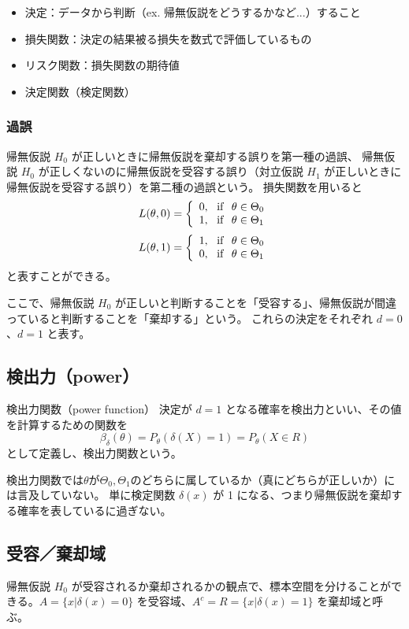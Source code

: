 \documentclass[10pt,a4paper]{ltjsarticle}
\begin{document}
\begin{itemize}
  \item 決定：データから判断（ex. 帰無仮説をどうするかなど...）すること
  \item 損失関数：決定の結果被る損失を数式で評価しているもの
  \item リスク関数：損失関数の期待値
  \item 決定関数（検定関数）
\end{itemize}


\subsubsection{過誤}

帰無仮説 $H_0$ が正しいときに帰無仮説を棄却する誤りを第一種の過誤、
帰無仮説 $H_0$ が正しくないのに帰無仮説を受容する誤り（対立仮説 $H_1$ が正しいときに帰無仮説を受容する誤り）を第二種の過誤という。
損失関数を用いると
\begin{equation}
  L(\theta, 0)
  = \left\{
    \begin{array}{ll}
    0,~~\rm{if~~\theta \in \Theta_0} \\
    1,~~\rm{if~~\theta \in \Theta_1} 
    \end{array}
  \right.
\end{equation}
\begin{equation}
  L(\theta, 1)
  = \left\{
    \begin{array}{ll}
    1,~~\rm{if~~\theta \in \Theta_0} \\
    0,~~\rm{if~~\theta \in \Theta_1} 
    \end{array}
  \right.
\end{equation}
と表すことができる。

ここで、帰無仮説 $H_0$ が正しいと判断することを「受容する」、帰無仮説が間違っていると判断することを「棄却する」という。
これらの決定をそれぞれ $d=0$、$d=1$ と表す。


\subsection{検出力（power）}

\begin{itembox}[l]{検出力関数（power function）}
  決定が $d=1$ となる確率を検出力といい、その値を計算するための関数を
\begin{equation}
  \beta_\delta(\theta) = P_\theta(\delta(X)=1) = P_\theta(X\in R)
\end{equation}
として定義し、検出力関数という。
\end{itembox}

検出力関数では$\theta$が$\Theta_0,\Theta_1$のどちらに属しているか（真にどちらが正しいか）には言及していない。
単に検定関数 $\delta(x)$ が 1 になる、つまり帰無仮説を棄却する確率を表しているに過ぎない。


\subsection{受容／棄却域}

帰無仮説 $H_0$ が受容されるか棄却されるかの観点で、標本空間を分けることができる。$A=\{x|\delta(x)=0\}$ を受容域、$A^c=R=\{x|\delta(x)=1\}$ を棄却域と呼ぶ。
\end{document}
